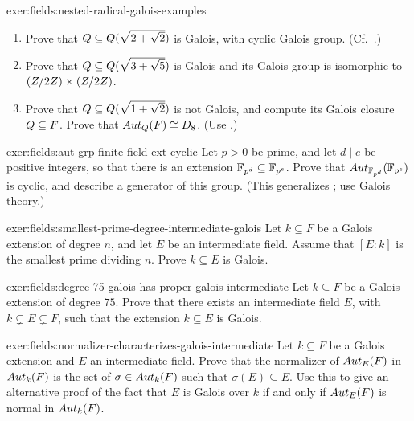 \begin{exer}{}{exer:fields:nested-radical-galois-examples}
  \begin{enumerate}[label=(\roman*)]
  \item Prove that $Q \subseteq Q(\sqrt{2 + \sqrt{2}})$ is Galois,
    with cyclic Galois group. (Cf.\
    .)
  \item Prove that $Q \subseteq Q(\sqrt{3 + \sqrt{5}})$ is Galois
    and its Galois group is isomorphic to $(Z/2Z) \times (Z/2Z)$.
  \item Prove that $Q \subseteq Q(\sqrt{1 + \sqrt{2}})$ is not
    Galois, and compute its Galois closure $Q \subseteq F$. Prove
    that $Aut_{Q}(F) \cong D_8$. (Use
    .)
  \end{enumerate}
\end{exer}
\begin{exer}{}{exer:fields:aut-grp-finite-field-ext-cyclic}
  Let $p > 0$ be prime, and let $d \mid e$ be positive integers, so
  that there is an extension $\mathbb{F}_{p^d} \subseteq \mathbb{F}_{p^e}$. Prove that
  $Aut_{\mathbb{F}_{p^d}}(\mathbb{F}_{p^e})$ is cyclic, and describe a generator of
  this group. (This generalizes ; use Galois
  theory.)
\end{exer}
\begin{exer}{}{exer:fields:smallest-prime-degree-intermediate-galois}
  Let $k \subseteq F$ be a Galois extension of degree $n$, and let $E$
  be an intermediate field. Assume that $[E : k]$ is the smallest
  prime dividing $n$. Prove $k \subseteq E$ is Galois.
\end{exer}
\begin{exer}{}{exer:fields:degree-75-galois-has-proper-galois-intermediate}
  Let $k \subseteq F$ be a Galois extension of degree $75$. Prove that
  there exists an intermediate field $E$, with
  $k \subsetneq E \subsetneq F$, such that the extension
  $k \subseteq E$ is Galois.
\end{exer}
\begin{exer}{}{exer:fields:normalizer-characterizes-galois-intermediate}
  Let $k \subseteq F$ be a Galois extension and $E$ an intermediate
  field.  Prove that the normalizer of $Aut_E(F)$ in $Aut_k(F)$ is
  the set of $\sigma \in Aut_k(F)$ such that $\sigma(E) \subseteq
  E$. Use this to give an alternative proof of the fact that $E$ is
  Galois over $k$ if and only if $Aut_E(F)$ is normal in $Aut_k(F)$.
\end{exer}
